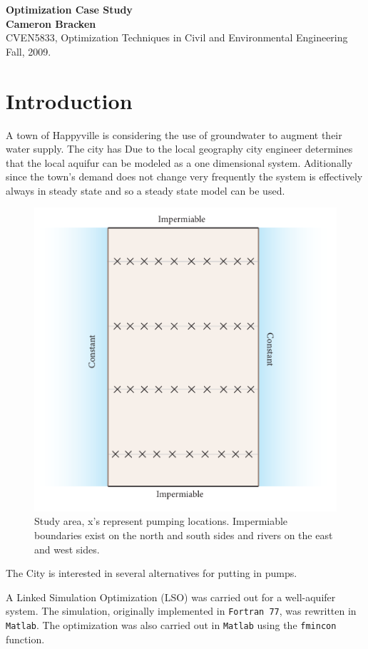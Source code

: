 \documentclass[12pt,twoside]{article}
\begin{document}
\thispagestyle{empty} 

\begin{flushleft}
	\textbf{\Large Optimization Case Study}
 	{\bf\\ Cameron Bracken \\}
  	CVEN5833, Optimization Techniques in Civil and Environmental Engineering\\ 
	Fall, 2009.
\end{flushleft}

\section*{Introduction}

A town of Happyville is considering the use of groundwater to augment their water supply.  The city has Due to the local geography city engineer determines that the local aquifur can be modeled as a one dimensional system.  Aditionally since the town's demand does not change very frequently the system is effectively always in steady state and so a steady state model can be used. 

\begin{figure}[!ht] %
   \centering
   \includegraphics[width=.7\textwidth]{figs/site.pdf} 
   \caption{Study area, x's represent pumping locations.  Impermiable boundaries exist on the north and south sides and rivers on the east and west sides.}
   \label{fig:flow}
\end{figure}

The City is interested in several alternatives for putting in pumps.  

A Linked Simulation Optimization (LSO) was carried out for a well-aquifer system. The simulation, originally implemented in \verb"Fortran 77", was rewritten in \verb"Matlab".  The optimization was also carried out in \verb"Matlab" using the \verb"fmincon" function. 
\end{document}
